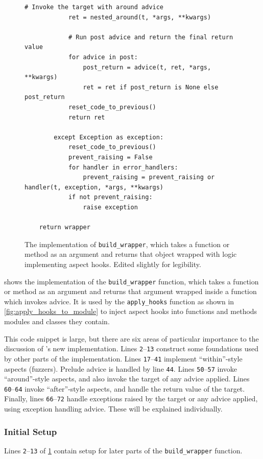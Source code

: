 \begin{figure}
\begin{lstlisting}[style=footnotesize_python]
            # Invoke the target with around advice
            ret = nested_around(t, *args, **kwargs)
            
            # Run post advice and return the final return value
            for advice in post:
                post_return = advice(t, ret, *args, **kwargs)
                ret = ret if post_return is None else post_return
            reset_code_to_previous()
            return ret

        except Exception as exception:
            reset_code_to_previous()
            prevent_raising = False
            for handler in error_handlers:
                prevent_raising = prevent_raising or handler(t, exception, *args, **kwargs)
            if not prevent_raising:
                raise exception

    return wrapper
    \end{lstlisting}
    \caption{The implementation of \lstinline{build_wrapper}, which takes a
    function or method as an argument and returns that object wrapped with logic
    implementing aspect hooks. Edited slightly for legibility.}
    \label{fig:build_wrapper_impl}
\end{figure}

 shows the implementation of the
\lstinline{build_wrapper} function, which takes a function or method as an
argument and returns that argument wrapped inside a function which invokes
advice. It is used by the \lstinline{apply_hooks} function as shown in
\cref{fig:apply_hooks_to_module} to inject aspect hooks into functions and
methods modules and classes they contain.

This code snippet is large, but there are six areas of particular importance to
the discussion of \pdsf{}'s new implementation. Lines \texttt{2}--\texttt{13}
construct some foundations used by other parts of the implementation. Lines
\texttt{17}--\texttt{41} implement ``within''-style aspects (fuzzers). Prelude
advice is handled by line \texttt{44}. Lines
\texttt{50}--\texttt{57} invoke ``around''-style aspects, and also invoke the target
of any advice applied. Lines
\texttt{60}--\texttt{64} invoke ``after''-style aspects, and handle the return
value of the target. Finally, lines \texttt{66}--\texttt{72} handle exceptions
raised by the target or any advice applied, using exception handling advice.
These will be explained individually.

\subsubsection{Initial Setup}
Lines \texttt{2}--\texttt{13} of \cref{fig:build_wrapper_impl} contain setup for
later parts of the \lstinline{build_wrapper} function.

